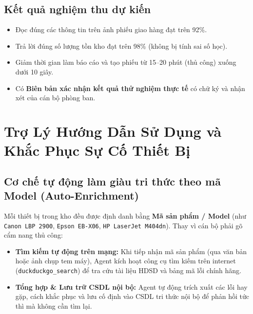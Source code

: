 \documentclass[11pt,a4paper]{article}
\begin{document}
\subsection{Kết quả nghiệm thu dự kiến}
\begin{itemize}
    \item Đọc đúng các thông tin trên ảnh phiếu giao hàng đạt trên 92\%.
    \item Trả lời đúng số lượng tồn kho đạt trên 98\% (không bị tính sai số học).
    \item Giảm thời gian làm báo cáo và tạo phiếu từ 15--20 phút (thủ công) xuống dưới 10 giây.
    \item Có \textbf{Biên bản xác nhận kết quả thử nghiệm thực tế} có chữ ký và nhận xét của cán bộ phòng ban.
\end{itemize}

\section{Trợ Lý Hướng Dẫn Sử Dụng và Khắc Phục Sự Cố Thiết Bị}

\subsection{Cơ chế tự động làm giàu tri thức theo mã Model (Auto-Enrichment)}
Mỗi thiết bị trong kho đều được định danh bằng \textbf{Mã sản phẩm / Model} (như \texttt{Canon LBP 2900}, \texttt{Epson EB-X06}, \texttt{HP LaserJet M404dn}). Thay vì cán bộ phải gõ cẩm nang thủ công:
\begin{itemize}
    \item \textbf{Tìm kiếm tự động trên mạng:} Khi tiếp nhận mã sản phẩm (qua văn bản hoặc ảnh chụp tem máy), Agent kích hoạt công cụ tìm kiếm trên internet (\texttt{duckduckgo\_search}) để tra cứu tài liệu HDSD và bảng mã lỗi chính hãng.
    \item \textbf{Tổng hợp \& Lưu trữ CSDL nội bộ:} Agent tự động trích xuất các lỗi hay gặp, cách khắc phục và lưu cố định vào CSDL tri thức nội bộ để phản hồi tức thì mà không cần tìm lại.
\end{itemize}
\end{document}
